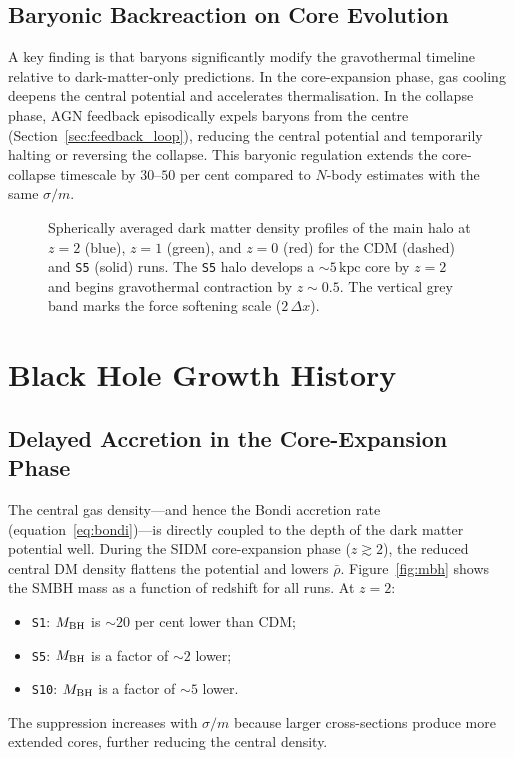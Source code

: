 \documentclass[fleqn,usenatbib]{mnras}
\newcommand{\code}[1]{\texttt{#1}}
\newcommand{\sigmam}{\sigma/m}
\newcommand{\kpc}{\,\mathrm{kpc}}
\newcommand{\MBH}{M_{\rm BH}}
\begin{document}
\subsection{Baryonic Backreaction on Core Evolution}

A key finding is that baryons significantly modify the gravothermal
timeline relative to dark-matter-only predictions.  In the
core-expansion phase, gas cooling deepens the central potential and
accelerates thermalisation.  In the collapse phase, AGN feedback
episodically expels baryons from the centre (Section~\ref{sec:feedback_loop}),
reducing the central potential and temporarily halting or reversing the
collapse.  This baryonic regulation extends the core-collapse
timescale by $30$--$50$ per cent compared to $N$-body estimates with
the same $\sigmam$.

\begin{figure}
  \centering
  \caption{Spherically averaged dark matter density profiles of the
    main halo at $z=2$ (blue), $z=1$ (green), and $z=0$ (red) for the
    CDM (dashed) and \code{S5} (solid) runs.  The \code{S5} halo
    develops a $\sim 5\kpc$ core by $z=2$ and begins gravothermal
    contraction by $z \sim 0.5$.  The vertical grey band marks the
    force softening scale ($2\,\Delta x$).}
  \label{fig:profiles}
\end{figure}


\section{Black Hole Growth History}
\label{sec:bh_growth}

\subsection{Delayed Accretion in the Core-Expansion Phase}

The central gas density---and hence the Bondi accretion rate
(equation~\ref{eq:bondi})---is directly coupled to the depth of the
dark matter potential well.  During the SIDM core-expansion phase
($z \gtrsim 2$), the reduced central DM density flattens the potential
and lowers $\bar\rho$.  Figure~\ref{fig:mbh} shows the SMBH mass as a
function of redshift for all runs.  At $z = 2$:
\begin{itemize}
  \item \code{S1}: $\MBH$ is $\sim 20$ per cent lower than CDM;
  \item \code{S5}: $\MBH$ is a factor of $\sim 2$ lower;
  \item \code{S10}: $\MBH$ is a factor of $\sim 5$ lower.
\end{itemize}
The suppression increases with $\sigmam$ because larger cross-sections
produce more extended cores, further reducing the central density.
\end{document}
